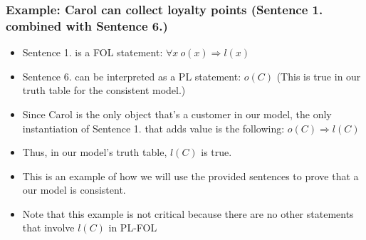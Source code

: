 \documentclass[11pt]{article}
\begin{document}
\subsubsection{Example: Carol can collect loyalty points (Sentence 1. combined with Sentence 6.)}
\label{sec:orgf244fdb}
\begin{itemize}
\item Sentence 1. is a FOL statement: \(\forall x \: o(x) \Rightarrow l(x)\)
\item Sentence 6. can be interpreted as  a PL statement: \(o(C)\) (This is true in our truth table for the consistent model.)
\item Since Carol is the only object that's a customer in our model, the only instantiation of Sentence 1. that adds value is the following: \(o(C) \Rightarrow l(C)\)
\item Thus, in our model's truth table, \(l(C)\) is true.
\item This is an example of how we will use the provided sentences to prove that a our model is consistent.
\item Note that this example is not critical because there are no other statements that involve \(l(C)\) in PL-FOL
\end{itemize}
\end{document}
